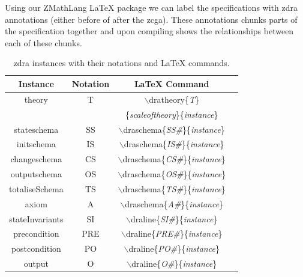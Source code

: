 Using our ZMathLang \LaTeX{} package we can label the specifications with
\gls{zdra} annotations (either before of after the \gls{zcga}). These
annotations chunks parts of the specification together and upon compiling shows
the relationships between each of these chunks.

\begin{table}[H]
\begin{tabular}{| c | c | c | c |}
\hline
\textbf{Instance} & \textbf{Notation} & \textbf{\LaTeX{} Command}  \\
\hline
theory & T & $\backslash$dratheory\{\textit{T}\}\\
& & \{\textit{scaleoftheory}\}\{\textit{instance}\}  \\
\hline
stateschema & SS & $\backslash$draschema\{\textit{SS\#}\}\{\textit{instance}\}
\\
\hline
initschema & IS & $\backslash$draschema\{\textit{IS\#}\}\{\textit{instance}\}
\\
\hline
changeschema & CS & $\backslash$draschema\{\textit{CS\#}\}\{\textit{instance}\}
\\
\hline
outputschema & OS & $\backslash$draschema\{\textit{OS\#}\}\{\textit{instance}\}
\\
\hline
totaliseSchema & TS &
$\backslash$draschema\{\textit{TS\#}\}\{\textit{instance}\}  \\
\hline
axiom & A  & $\backslash$draschema\{\textit{A\#}\}\{\textit{instance}\}  \\
\hline
stateInvariants & SI & $\backslash$draline\{\textit{SI\#}\}\{\textit{instance}\}
\\
\hline
precondition & PRE & $\backslash$draline\{\textit{PRE\#}\}\{\textit{instance}\}
\\
\hline
postcondition & PO  & $\backslash$draline\{\textit{PO\#}\}\{\textit{instance}\}
\\
\hline
output & O  & $\backslash$draline\{\textit{O\#}\}\{\textit{instance}\}  \\
\hline
\end{tabular}
\caption{\label{tab:instances} \gls{zdra} instances with their notations and \LaTeX{} commands.}
\end{table}

